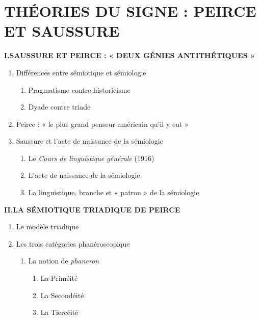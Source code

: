 \newfontfamily{}
\chapter{THÉORIES DU SIGNE : PEIRCE ET SAUSSURE}
\label{chapter-6}
\begin{keybox}
\small
\textbf{I.\quad SAUSSURE ET PEIRCE : « DEUX GÉNIES ANTITHÉTIQUES »}
\begin{enumerate}[label=\arabic*.]
\item Différences entre sémiotique et sémiologie
\begin{enumerate}[label=\textcircled{\scriptsize\arabic*}]
\item Pragmatisme contre historicisme
\item Dyade contre triade
\end{enumerate}
\item Peirce : « le plus grand penseur américain qu’il y eut »
\item Saussure et l’acte de naissance de la sémiologie
\begin{enumerate}[label=\textcircled{\scriptsize\arabic*}]
\item Le \textit{Cours de linguistique générale} (1916)
\item L’acte de naissance de la sémiologie
\item La linguistique, branche et « patron » de la sémiologie
\end{enumerate}
\end{enumerate}
\textbf{II.\quad LA SÉMIOTIQUE TRIADIQUE DE PEIRCE}
\begin{enumerate}[label=\arabic*.]
\item Le modèle triadique
\item Les trois catégories phanéroscopique
\begin{enumerate}[label=\textcircled{\scriptsize\arabic*}]
\item La notion de \textit{phaneron}
\begin{enumerate}[label=\arabic*.]
\item La Priméité
\item La Secondéité
\item La Tiercéité
\end{enumerate}

\end{enumerate}
\end{enumerate}
\end{keybox}
